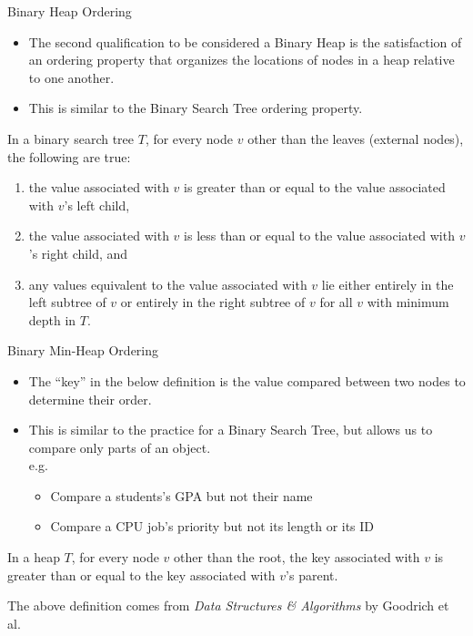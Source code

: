 \documentclass[10pt,compress]{beamer}
\begin{document}
\begin{frame}{Binary Heap Ordering}
  \begin{itemize}
    \item The second qualification to be considered a Binary Heap is the satisfaction of an ordering property that organizes the locations of nodes in a heap relative to one another.
    \item This is similar to the Binary Search Tree ordering property.
  \end{itemize}
  \begin{bst_ordering}
    In a binary search tree $T$, for every node $v$ other than the leaves (external nodes), the following are true:
    \begin{enumerate}
      \item the value associated with $v$ is greater than or equal to the value associated with $v$'s left child,
      \item the value associated with $v$ is less than or equal to the value associated with $v$'s right child, and
      \item any values equivalent to the value associated with $v$ lie either entirely in the left subtree of $v$ or entirely in the right subtree of $v$ for all $v$ with minimum depth in $T$.
    \end{enumerate}
  \end{bst_ordering}
\end{frame}

\begin{frame}{Binary Min-Heap Ordering}
  \begin{itemize}
    \item The ``key'' in the below definition is the value compared between two nodes to determine their order.
    \item This is similar to the practice for a Binary Search Tree, but allows us to compare only parts of an object.\\
          e.g.
          \begin{itemize}
            \item Compare a students's GPA but not their name
            \item Compare a CPU job's priority but not its length or its ID
          \end{itemize}
  \end{itemize}
  \begin{min_heap_ordering} 
    In a heap $T$, for every node $v$ other than the root, the key associated with $v$ is greater than or equal to the key associated with $v$'s parent.
  \end{min_heap_ordering}

  The above definition comes from \textit{Data Structures \& Algorithms} by Goodrich et al.
\end{frame}
\end{document}
